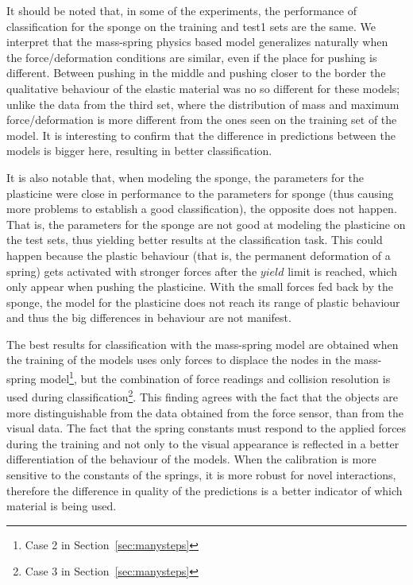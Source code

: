 \documentclass[journal]{IEEEtran}
\newcommand{\sref}[1]{Section~\ref{#1}}
\begin{document}
It should be noted that, in some of the experiments, the performance of classification for the sponge on the training and test1 sets are the same.  We interpret that the mass-spring physics based model generalizes naturally when the force/deformation conditions are similar, even if the place for pushing is different.  Between pushing in the middle and pushing closer to the border the qualitative behaviour of the elastic material was no so different for these models; unlike the data from the third set, where the distribution of mass and maximum force/deformation is more different from the ones seen on the training set of the model.  It is interesting to confirm that the difference in predictions between the models is bigger here, resulting in better classification.

It is also notable that, when modeling the sponge, the parameters for the plasticine were close in performance to the parameters for sponge (thus causing more problems to establish a good classification), the opposite does not happen.  That is, the parameters for the sponge are not good at modeling the plasticine on the test sets, thus yielding better results at the classification task.  This could happen because the plastic behaviour (that is, the permanent deformation of a spring) gets activated with stronger forces after the $yield$ limit is reached, which only appear when pushing the plasticine.  With the small forces fed back by the sponge, the model for the plasticine does not reach its range of plastic behaviour and thus the big differences in behaviour are not manifest.


The best results for classification with the mass-spring model are obtained when the training of the models uses only forces to displace the nodes in the mass-spring model\footnote{Case 2 in \sref{sec:manysteps}}, but the combination of force readings and collision resolution is used during classification\footnote{Case 3 in \sref{sec:manysteps}}.  This finding agrees with the fact that the objects are more distinguishable from the data obtained from the force sensor, than from the visual data.  The fact that the spring constants must respond to the applied forces during the training and not only to the visual appearance is reflected in a better differentiation of the behaviour of the models.  When the calibration is more sensitive to the constants of the springs, it is more robust for novel interactions, therefore the difference in quality of the predictions is a better indicator of which material is being used.
\end{document}
